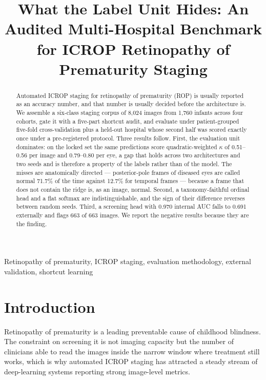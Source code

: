 \documentclass{article}
\title{What the Label Unit Hides: An Audited Multi-Hospital Benchmark\\
       for ICROP Retinopathy of Prematurity Staging}
\begin{document}
\maketitle

\begin{abstract}
Automated ICROP staging for retinopathy of prematurity (ROP) is usually reported
as an accuracy number, and that number is usually decided before the architecture
is. We assemble a six-class staging corpus of 8{,}024 images from 1{,}760 infants
across four cohorts, gate it with a five-part shortcut audit, and evaluate under
patient-grouped five-fold cross-validation plus a held-out hospital whose second
half was scored exactly once under a pre-registered protocol. Three results
follow. First, the evaluation unit dominates: on the locked set the same
predictions score quadratic-weighted $\kappa$ of 0.51--0.56 per image and
0.79--0.80 per eye, a gap that holds across two architectures and two seeds and
is therefore a property of the labels rather than of the model. The misses are
anatomically directed --- posterior-pole frames of diseased eyes are called
normal 71.7\% of the time against 12.7\% for temporal frames --- because a frame
that does not contain the ridge is, as an image, normal. Second, a
taxonomy-faithful ordinal head and a flat softmax are indistinguishable, and the
sign of their difference reverses between random seeds. Third, a screening head
with 0.970 internal AUC falls to 0.691 externally and flags 663 of 663 images. We
report the negative results because they are the finding.
\end{abstract}

\begin{keywords}
Retinopathy of prematurity, ICROP staging, evaluation methodology,
external validation, shortcut learning
\end{keywords}

\section{Introduction}
\label{sec:intro}

Retinopathy of prematurity is a leading preventable cause of childhood blindness.
The constraint on screening it is not imaging capacity but the number of
clinicians able to read the images inside the narrow window where treatment still
works, which is why automated ICROP staging has attracted a steady stream of
deep-learning systems reporting strong image-level metrics.
\end{document}
